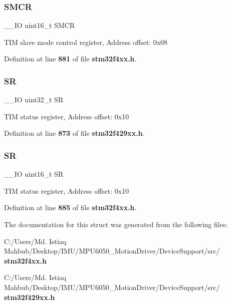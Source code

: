 \subsubsection{S\+M\+CR\hspace{0.1cm}{\footnotesize\ttfamily [2/2]}}
{\footnotesize\ttfamily \+\_\+\+\_\+\+IO uint16\+\_\+t S\+M\+CR}

T\+IM slave mode control register, Address offset\+: 0x08 

Definition at line \textbf{ 881} of file \textbf{ stm32f4xx.\+h}.

\mbox{\label{structTIM__TypeDef_af6aca2bbd40c0fb6df7c3aebe224a360}} 
\subsubsection{SR\hspace{0.1cm}{\footnotesize\ttfamily [1/2]}}
{\footnotesize\ttfamily \+\_\+\+\_\+\+IO uint32\+\_\+t SR}

T\+IM status register, Address offset\+: 0x10 

Definition at line \textbf{ 873} of file \textbf{ stm32f429xx.\+h}.

\mbox{\label{structTIM__TypeDef_a44962ea5442d203bf4954035d1bfeb9d}} 
\subsubsection{SR\hspace{0.1cm}{\footnotesize\ttfamily [2/2]}}
{\footnotesize\ttfamily \+\_\+\+\_\+\+IO uint16\+\_\+t SR}

T\+IM status register, Address offset\+: 0x10 

Definition at line \textbf{ 885} of file \textbf{ stm32f4xx.\+h}.



The documentation for this struct was generated from the following files\+:\begin{DoxyCompactItemize}
\item 
C\+:/\+Users/\+Md. Istiaq Mahbub/\+Desktop/\+I\+M\+U/\+M\+P\+U6050\+\_\+\+Motion\+Driver/\+Device\+Support/src/\textbf{ stm32f4xx.\+h}\item 
C\+:/\+Users/\+Md. Istiaq Mahbub/\+Desktop/\+I\+M\+U/\+M\+P\+U6050\+\_\+\+Motion\+Driver/\+Device\+Support/src/\textbf{ stm32f429xx.\+h}\end{DoxyCompactItemize}
